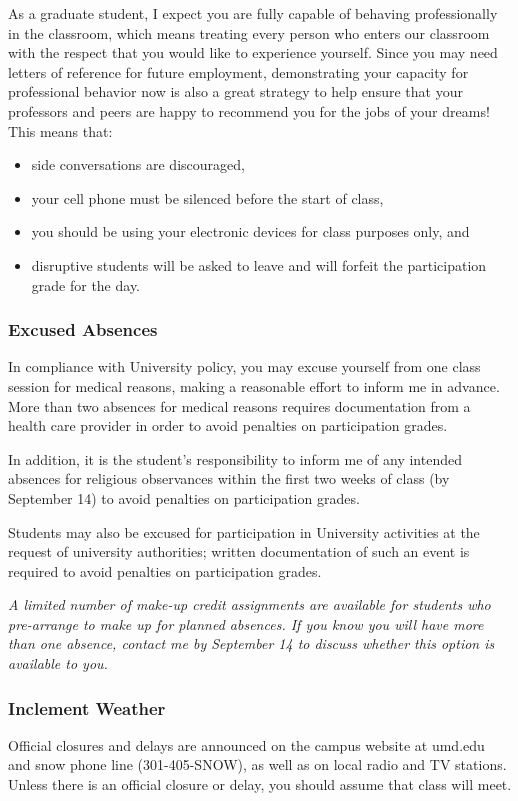 \documentclass[11pt]{article}
\begin{document}
As a graduate student, I expect you are fully capable of behaving professionally in the classroom, which means treating every person who enters our classroom with the respect that you would like to experience yourself.
Since you may need letters of reference for future employment, demonstrating your capacity for professional behavior now is also a great strategy to help ensure that your professors and peers are happy to recommend you for the jobs of your dreams!
This means that:
\begin{itemize}
\item side conversations are discouraged,
\item your cell phone must be silenced before the start of class,
\item you should be using your electronic devices for class purposes only, and
\item disruptive students will be asked to leave and will forfeit the participation grade for the day.
\end{itemize}

\subsubsection{Excused Absences}
In compliance with University policy, you may excuse yourself from one class session for medical reasons, making a reasonable effort to inform me in advance.
More than two absences for medical reasons requires documentation from a health care provider in order to avoid penalties on participation grades.

In addition, it is the student's responsibility to inform me of any intended absences for religious observances within the first two weeks of class (by September 14) to avoid penalties on participation grades.

Students may also be excused for participation in University activities at the request of university authorities; written documentation of such an event is required to avoid penalties on participation grades.

\textit{A limited number of make-up credit assignments are available for students who pre-arrange to make up for planned absences. If you know you will have more than one absence, contact me by September 14 to discuss whether this option is available to you.}

\subsubsection{Inclement Weather}
Official closures and delays are announced on the campus website at umd.edu and snow phone line (301-405-SNOW), as well as on local radio and TV stations.
Unless there is an official closure or delay, you should assume that class will meet.
\end{document}
